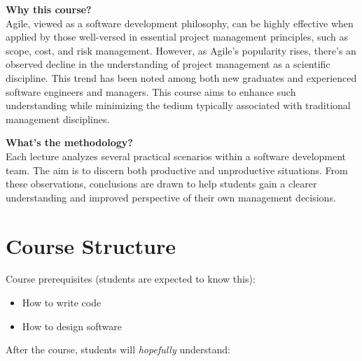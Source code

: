 \documentclass[nobrand,anonymous,nodate,nosecurity]{huawei}
\renewcommand\emph[1]{\textit{#1}}
\begin{document}
{\textbf{Why this course?}\\
Agile, viewed as a software development philosophy, can be highly effective when applied by those well-versed in essential project management principles, such as scope, cost, and risk management.
However, as Agile's popularity rises, there's an observed decline in the understanding of project management as a scientific discipline.
This trend has been noted among both new graduates and experienced software engineers and managers.
This course aims to enhance such understanding while minimizing the tedium typically associated with traditional management disciplines.

\textbf{What's the methodology?}\\
Each lecture analyzes several practical scenarios within a software development team.
The aim is to discern both productive and unproductive situations.
From these observations, conclusions are drawn to help students gain a clearer understanding and improved perspective of their own management decisions.

\newpage
\section*{Course Structure}

Course prerequisites (students are expected to know this):

\begin{itemize}
\item How to write code
\item How to design software
\end{itemize}

After the course, students will \emph{hopefully} understand:

}
\end{document}
